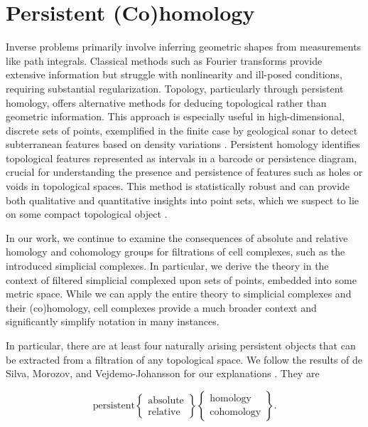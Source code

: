 \section{Persistent (Co)homology}
Inverse problems primarily involve inferring geometric shapes from measurements like path integrals. Classical methods such as Fourier transforms provide extensive information but struggle with nonlinearity and ill-posed conditions, requiring substantial regularization. Topology, particularly through persistent homology, offers alternative methods for deducing topological rather than geometric information. This approach is especially useful in high-dimensional, discrete sets of points, exemplified in the finite case by geological sonar to detect subterranean features based on density variations \cite[§1]{de2011dualities}. Persistent homology identifies topological features represented as intervals in a barcode or persistence diagram, crucial for understanding the presence and persistence of features such as holes or voids in topological spaces. This method is statistically robust and can provide both qualitative and quantitative insights into point sets, which we suspect to lie on some compact topological object \cite{chazal2014persistence,chazal2009proximity}.

In our work, we continue to examine the consequences of absolute and relative homology and cohomology groups for filtrations of cell complexes, such as the introduced simplicial complexes. In particular, we derive the theory in the context of filtered simplicial complexed upon sets of points, embedded into some metric space. While we can apply the entire theory to simplicial complexes and their (co)homology, cell complexes provide a much broader context and significantly simplify notation in many instances.

In particular, there are at least four naturally arising persistent objects that can be extracted from a filtration of any topological space. We follow the results of de Silva, Morozov, and Vejdemo-Johansson for our explanations \cite[§1]{de2011dualities}. They are

\begin{equation*}
\text{persistent}
\begin{Bmatrix} \text{absolute} \\ \text{relative} \end{Bmatrix}
\begin{Bmatrix} \text{homology} \\ \text{cohomology} \end{Bmatrix}.
\end{equation*}

